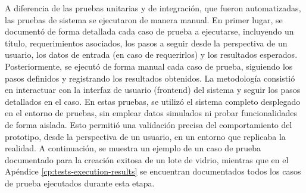 A diferencia de las pruebas unitarias y de integración, que fueron automatizadas, las pruebas de sistema se ejecutaron de manera manual. En primer lugar, se documentó de forma detallada cada caso de prueba a ejecutarse, incluyendo un título, requerimientos asociados, los pasos a seguir desde la perspectiva de un usuario, los datos de entrada (en caso de requerirlos) y los resultados esperados. Posteriormente, se ejecutó de forma manual cada caso de prueba, siguiendo los pasos definidos y registrando los resultados obtenidos. La metodología consistió en interactuar con la interfaz de usuario (frontend) del sistema y seguir los pasos detallados en el caso. En estas pruebas, se utilizó el sistema completo desplegado en el entorno de pruebas, sin emplear datos simulados ni probar funcionalidades de forma aislada. Esto permitió una validación precisa del comportamiento del prototipo, desde la perspectiva de un usuario, en un entorno que replicaba la realidad. A continuación, se muestra un ejemplo de un caso de prueba documentado para la creación exitosa de un lote de vidrio, mientras que en el Apéndice \ref{cp:tests-execution-results} se encuentran documentados todos los casos de prueba ejecutados durante esta etapa.


